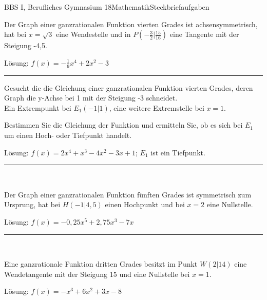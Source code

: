 \documentclass[oneside,openany,headings=optiontotoc,11pt,numbers=noenddot]{scrreprt}
\begin{document}
		\begin{worksheet}{BBS I, Berufliches Gymnasium 18}{Mathematik}{Steckbriefaufgaben}
			\begin{framed}
				\noindent
				Der Graph einer ganzrationalen Funktion vierten Grades ist achsensymmetrisch, hat bei \( x = \sqrt{3}\) eine Wendestelle und in \(P(-\frac{3}{2}|\frac{15}{16})\) eine Tangente mit der Steigung -4,5.\\
				\par\noindent
				\footnotesize{Lösung: \(f(x) = -\frac{1}{9}x^4 + 2x^2 -3\)}\\\normalsize
				\par\noindent
				\rule{\textwidth}{0.1pt}
				Gesucht die die Gleichung einer ganzrationalen Funktion vierten Grades, deren Graph die y-Achse bei 1 mit der Steigung -3 schneidet.\\
				Ein Extrempunkt bei \(E_1(-1|1)\), eine weitere Extremstelle bei \(x = 1\).\\
				\par\noindent
				Bestimmen Sie die Gleichung der Funktion und ermitteln Sie, ob es sich bei \(E_1\) um einen Hoch- oder Tiefpunkt handelt.\\
				\par\noindent
				\footnotesize{Lösung: \(f(x) = 2x^4 + x^3 -4x^2 -3x + 1\); \(E_1\) ist ein Tiefpunkt.}\\\normalsize
				\par\noindent
				\rule{\textwidth}{0.1pt}\\
				\par\noindent
				Der Graph einer ganzrationalen Funktion fünften Grades ist symmetrisch zum Ursprung, hat bei \(H(-1|4,5)\) einen Hochpunkt und bei \(x = 2\) eine Nullstelle.\\
				\par\noindent
				\footnotesize{Lösung: \(f(x) = -0,25x^5 + 2,75x^3 - 7x\)}\\
				\par\noindent
				\rule{\textwidth}{0.1pt}\\
				\par\noindent
				Eine ganzrationale Funktion dritten Grades besitzt im Punkt \(W(2|14)\) eine Wendetangente mit der Steigung 15 und eine Nullstelle bei \(x = 1\).\\
				\par\noindent
				\footnotesize{Lösung: \(f(x) = -x^3 + 6x^2 + 3x - 8\)}
			\end{framed}
		\end{worksheet}
\end{document}
